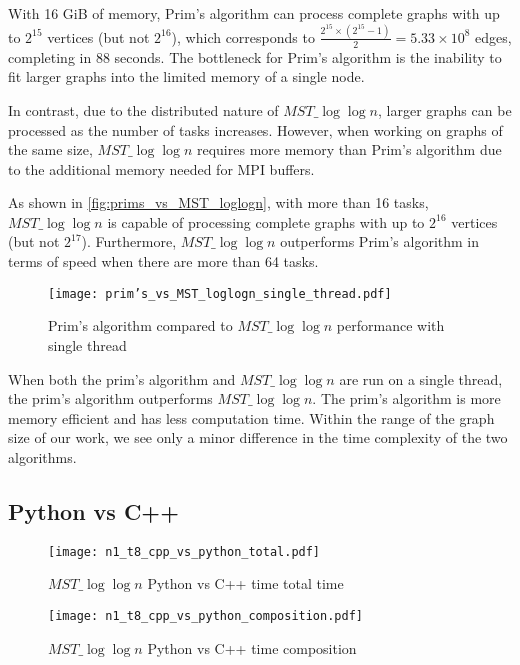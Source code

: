 \documentclass[english, 12pt, a4paper, elec, utf8, a-2b, online]{aaltothesis}
\newcommand{\mstalgo}{$MST\_\log\log{n}$}
\begin{document}
With 16 GiB of memory, Prim's algorithm can process complete graphs with up to \(2^{15}\) vertices (but not \(2^{16}\)), which corresponds to \(\frac{2^{15} \times (2^{15} - 1)}{2} = 5.33 \times 10^8\) edges, completing in 88 seconds. The bottleneck for Prim's algorithm is the inability to fit larger graphs into the limited memory of a single node.

In contrast, due to the distributed nature of \mstalgo{}, larger graphs can be processed as the number of tasks increases. However, when working on graphs of the same size, \mstalgo{} requires more memory than Prim's algorithm due to the additional memory needed for MPI buffers.

As shown in \cref{fig:prims_vs_MST_loglogn}, with more than 16 tasks, \mstalgo{} is capable of processing complete graphs with up to \(2^{16}\) vertices (but not \(2^{17}\)). Furthermore, \mstalgo{} outperforms Prim's algorithm in terms of speed when there are more than 64 tasks.

\begin{figure}[h]
	\centering
		\texttt{[image: prim's\_vs\_MST\_loglogn\_single\_thread.pdf]}
	\caption{Prim's algorithm compared to \mstalgo{} performance with single thread}
	\label{fig:prim's_vs_A_single_thread.pdf}
\end{figure}

When both the prim's algorithm and \mstalgo{} are run on a single thread, the prim's algorithm outperforms \mstalgo{}. The prim's algorithm is more memory efficient and has less computation time. Within the range of the graph size of our work, we see only a minor difference in the time complexity of the two algorithms.
\subsection{Python vs C++}


\begin{figure}[h]
	\centering
		\texttt{[image: n1\_t8\_cpp\_vs\_python\_total.pdf]}
	\caption{\mstalgo{} Python vs C++ time total time}
	\label{fig:python_cpp_mpi_total.pdf}
\end{figure}

\begin{figure}[h]
	\centering
		\texttt{[image: n1\_t8\_cpp\_vs\_python\_composition.pdf]}
	\caption{\mstalgo{} Python vs C++ time composition}
	\label{fig:python_cpp_mpi.pdf}
\end{figure}
\end{document}
